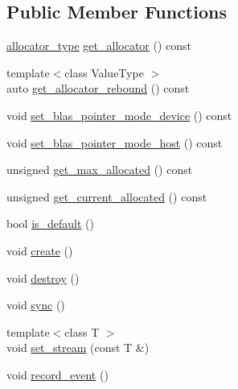\subsection*{Public Member Functions}
\begin{DoxyCompactItemize}
\item 
\hyperlink{structbc_1_1streams_1_1Logging__Stream_a8f20249b75af292f8b50c8bb09a82b38}{allocator\+\_\+type} \hyperlink{structbc_1_1streams_1_1Logging__Stream_aad1765cc934756cf8070c7dbcbc7a3f5}{get\+\_\+allocator} () const
\item 
{\footnotesize template$<$class Value\+Type $>$ }\\auto \hyperlink{structbc_1_1streams_1_1Logging__Stream_ad589e971e82052785fa3b1750bef1f88}{get\+\_\+allocator\+\_\+rebound} () const
\item 
void \hyperlink{structbc_1_1streams_1_1Logging__Stream_a19102963d3bb6835417334f4c2820d40}{set\+\_\+blas\+\_\+pointer\+\_\+mode\+\_\+device} () const
\item 
void \hyperlink{structbc_1_1streams_1_1Logging__Stream_a0b8dcbea3aa70c6f131f5038bc81d593}{set\+\_\+blas\+\_\+pointer\+\_\+mode\+\_\+host} () const
\item 
unsigned \hyperlink{structbc_1_1streams_1_1Logging__Stream_ab810973b3205fccd805f8a96b7245fa0}{get\+\_\+max\+\_\+allocated} () const
\item 
unsigned \hyperlink{structbc_1_1streams_1_1Logging__Stream_a14436a0b3b7dd144a57260ce98e8fdaf}{get\+\_\+current\+\_\+allocated} () const
\item 
bool \hyperlink{structbc_1_1streams_1_1Logging__Stream_a3e02e28b85328d667b0cc0ff6f27c9c1}{is\+\_\+default} ()
\item 
void \hyperlink{structbc_1_1streams_1_1Logging__Stream_a22847a19126bba1a9eab775c5f6133df}{create} ()
\item 
void \hyperlink{structbc_1_1streams_1_1Logging__Stream_a74ed4c6a60bf32c125c212d2fb07de10}{destroy} ()
\item 
void \hyperlink{structbc_1_1streams_1_1Logging__Stream_a6a045ca3bb0c8b607b8a3d5e7fb350d0}{sync} ()
\item 
{\footnotesize template$<$class T $>$ }\\void \hyperlink{structbc_1_1streams_1_1Logging__Stream_ae0f41d235013dfcd68199f15964320b1}{set\+\_\+stream} (const T \&)
\item 
void \hyperlink{structbc_1_1streams_1_1Logging__Stream_a053b8879f3940a865cfadbc297ff2855}{record\+\_\+event} ()
\item 

\end{DoxyCompactItemize}
